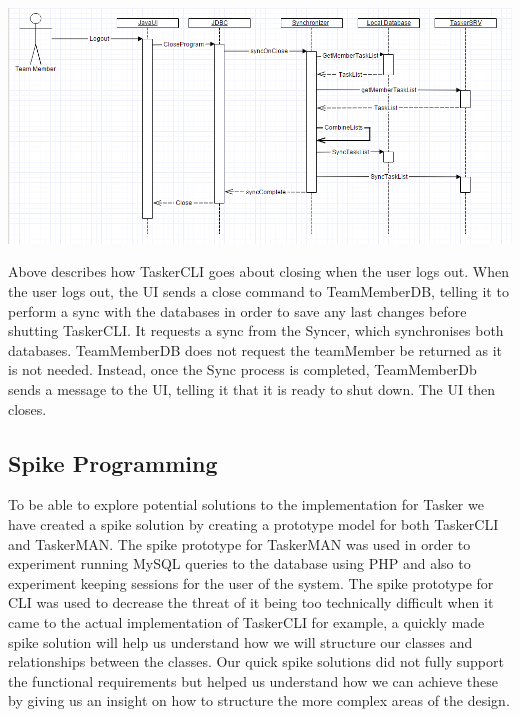 \documentclass{project}
\begin{document}
\includegraphics[width=1\textwidth, center]{images/Detailed-Design/TaskerCLISequenceDiagramLogout}

Above describes how TaskerCLI goes about closing when the user logs out. When the user logs out, the UI sends a close command to TeamMemberDB,
telling it to perform a sync with the databases in order to save any last changes before shutting TaskerCLI. It requests a sync from the Syncer,
which synchronises both databases. TeamMemberDB does not request the teamMember be returned as it is not needed. Instead, once the Sync process
is completed, TeamMemberDb sends a message to the UI, telling it that it is ready to shut down. The UI then closes. 

\clearpage

\subsection{Spike Programming} To be able to explore potential solutions to the implementation for Tasker we have created a spike solution by creating a prototype model for both TaskerCLI and TaskerMAN. The spike prototype for TaskerMAN was used in order to experiment running MySQL queries to the database using PHP and also to experiment keeping sessions for the user of the system. The spike prototype for CLI was used to decrease the threat of it being too technically difficult when it came to the actual implementation of TaskerCLI for example, a quickly made spike solution will help us understand how we will structure our classes and relationships between the classes. Our quick spike solutions did not fully support the functional requirements but helped us understand how we can achieve these by giving us an insight on how to structure the more complex areas of the design.   \\
\end{document}

